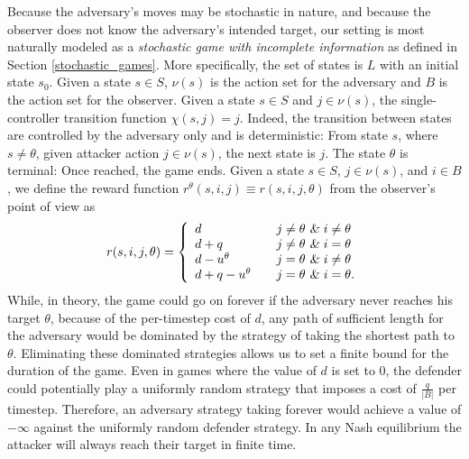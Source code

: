 Because the adversary's moves may be stochastic in nature, and because the observer does not know the adversary's intended target, 
our setting is most naturally modeled as a 
\emph{stochastic game with incomplete information} 
as defined in Section \ref{stochastic_games}.
More specifically, the set of states is $L$ with an initial state $s_0$.
Given a state $s \in S$, $\nu(s)$ is the action set 
for the adversary and $B$ is the action set for the 
observer. Given a state $s \in S$ and $j \in \nu(s)$, 
the single-controller transition function $\chi(s,j) = j$. 
Indeed, the transition between states are controlled 
by the adversary only and is deterministic: From state $s$,
where $s\neq \theta$, given attacker action $j \in \nu(s)$,
the next state is $j$. %
The state $\theta$ is terminal: Once reached, the game ends.
Given a state $s \in S$, $j \in \nu(s)$, and $i \in B$, 
we define the reward function $r^\theta(s,i,j) \equiv r(s, i, j, \theta)$ from the observer's point of view as
\begin{align}
r(s, i, j, \theta) = \left\{
        \begin{array}{ll}
            d & \quad j \neq \theta \textsl{ \& } i\neq \theta \\
            d+q & \quad j \neq \theta \textsl{ \& } i=\theta \\
            d-u^{\theta} & \quad j=\theta \textsl{ \& } i\neq \theta \\
           d+q-u^{\theta} & \quad j=\theta \textsl{ \& } i=\theta. \\
        \end{array}
    \right.
\end{align}
While, in theory, the game could go on forever if the adversary never reaches his target $\theta$, 
because of the per-timestep cost of $d$, any path of sufficient length for the adversary would be 
dominated by the strategy of taking the shortest path to $\theta$.
Eliminating these dominated strategies allows us to set a finite bound for the duration of the game. Even in games where the value of $d$ is set to 0, the defender could potentially play a uniformly random strategy that imposes a cost of $\frac{q}{| B |}$ per timestep. Therefore, an adversary strategy taking forever would achieve a value of $-\infty$ against the uniformly random defender strategy. In any Nash equilibrium the attacker will always reach their target in finite time.

